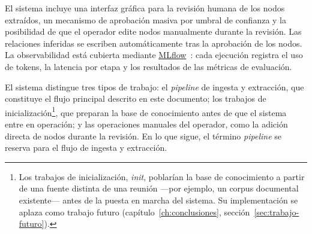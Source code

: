 El sistema incluye una interfaz gráfica para la revisión humana de los nodos extraídos, un
mecanismo de aprobación masiva por umbral de confianza y la posibilidad de que el operador
edite nodos manualmente durante la revisión. Las relaciones inferidas se escriben
automáticamente tras la aprobación de los nodos. La observabilidad está cubierta mediante
\href{https://mlflow.org}{MLflow}~\cite{zaharia2018mlflow}: cada ejecución registra el uso
de tokens, la latencia por etapa y los resultados de las métricas de evaluación.

El sistema distingue tres tipos de trabajo: el \textit{pipeline} de ingesta y extracción,
que constituye el flujo principal descrito en este documento; los trabajos de
inicialización\footnote{%
  Los trabajos de inicialización, \textit{init}, poblarían la base de conocimiento a partir
  de una fuente distinta de una reunión —por ejemplo, un corpus documental existente— antes
  de la puesta en marcha del sistema. Su implementación se aplaza como trabajo futuro
  (capítulo~\ref{ch:conclusiones}, sección~\ref{sec:trabajo-futuro}).%
}, que preparan la base de conocimiento antes de que el sistema entre en operación; y las
operaciones manuales del operador, como la adición directa de nodos durante la revisión. En
lo que sigue, el término \textit{pipeline} se reserva para el flujo de ingesta y extracción.

